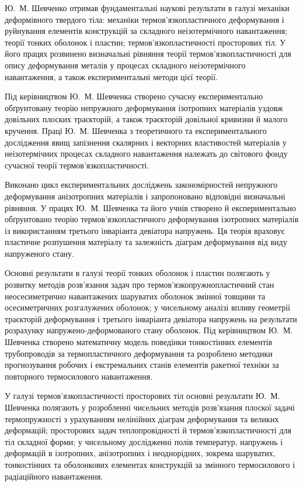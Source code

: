 Ю.~М. Шевченко отримав фундаментальні наукові результати в галузі механіки деформівного твердого тіла: механіки термов'язкопластичного деформування і руйнування елементів конструкцій за складного неізотермічного навантаження; теорії тонких оболонок і пластин; термов'язкопластичності просторових тіл. У його працях розвинено визначальні рівняння теорії термов'язкопластичності для опису деформування металів у процесах складного неізотермічного навантаження, а також експериментальні методи цієї теорії.

Під керівництвом Ю.~М. Шевченка створено сучасну експериментально обґрунтовану теорію непружного деформування ізотропних матеріалів уздовж довільних плоских траєкторій, а також траєкторій довільної кривизни й малого кручення. Праці Ю.~М. Шевченка з теоретичного та експериментального дослідження явищ запізнення скалярних і векторних властивостей матеріалів у неізотермічних процесах складного навантаження належать до світового фонду сучасної теорії термов'язкопластичності.

Виконано цикл експериментальних досліджень закономірностей непружного деформування анізотропних матеріалів і запропоновано відповідні визначальні рівняння. У працях Ю.~М. Шевченка та його учнів створено й експериментально обґрунтовано теорію термов'язкопластичного деформування ізотропних матеріалів із використанням третього інваріанта девіатора напружень. Ця теорія враховує пластичне розпушення матеріалу та залежність діаграм деформування від виду напруженого стану.

Основні результати в галузі теорії тонких оболонок і пластин полягають у розвитку методів розв'язання задач про термов'язкопружнопластичний стан неосесиметрично навантажених шаруватих оболонок змінної товщини та осесиметричних розгалужених оболонок; у чисельному аналізі впливу геометрії траєкторій деформування і третього інваріанта девіатора напружень на результати розрахунку напружено-деформованого стану оболонок. Під керівництвом Ю.~М. Шевченка створено математичну модель поведінки тонкостінних елементів трубопроводів за термопластичного деформування та розроблено методики прогнозування робочих і екстремальних станів елементів ракетної техніки за повторного термосилового навантаження.

У галузі термов'язкопластичності просторових тіл основні результати Ю.~М. Шевченка полягають у розробленні чисельних методів розв'язання плоскої задачі термопружності з урахуванням нелінійних діаграм деформування та великих деформацій; просторових задач теплопровідності й термов'язкопластичності для тіл складної форми; у чисельному дослідженні полів температур, напружень і деформацій в ізотропних, анізотропних і неоднорідних, зокрема шаруватих, тонкостінних та оболонкових елементах конструкцій за змінного термосилового і радіаційного навантаження.

